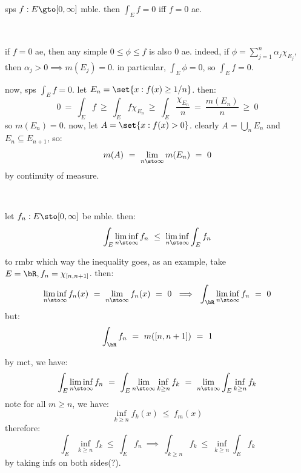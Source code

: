 \begin{lm}
	sps $f:E\gto[0,\infty]$ mble. then $\int_{E}f=0$ iff $f=0$ ae.
\end{lm} \

\begin{pf}
	if $f=0$ ae, then any simple $0\leq\phi\leq f$ is also 0 ae.
	indeed, if $\phi=\sum_{j=1}^{n}\alpha_{j}\chi_{E_{j}}$, then $\alpha_{j}>0 \implies m(E_{j})=0$.
	in particular, $\int_{E}\phi=0$, so $\int_{E}f=0$.

	now, sps $\int_{E}f=0$. let $E_{n}=\set{x:f(x)\geq1/n}$. then:
	\begin{equation*}
		0 \ = \ \int_{E}f \ \geq \ \int_{E}f\chi_{E_{n}}
		\ \geq \ \int_{E}\frac{\chi_{E_{n}}}{n}
		\ = \ \frac{m(E_{n})}{n} \ \geq \ 0
	\end{equation*}
	so $m(E_{n})=0$. now, let $A=\set{x:f(x)>0}$.
	clearly $A=\bigcup_{n}E_{n}$ and $E_{n}\subseteq E_{n+1}$, so:
	\begin{equation*}
		m(A) \ = \ \lim_{n\sto\infty}m(E_{n}) \ = \ 0
	\end{equation*}
	by continuity of measure.
\end{pf} \

\begin{thm}[title=Fatou's Lemma]
	let $f_{n}:E\sto[0,\infty]$ be mble. then:
	\begin{equation*}
		\int_{E}\liminf_{n\sto\infty}f_{n}
		\ \leq \ \liminf_{n\sto\infty}\int_{E}f_{n}
	\end{equation*}
\end{thm}

to rmbr which way the inequality goes, as an example,
take $E=\bR,f_{n}=\chi_{[n,n+1]}$. then:
\begin{equation*}
	\liminf_{n\sto\infty}f_{n}(x) \ = \ \lim_{n\sto\infty}f_{n}(x) \ = \ 0
	\ \implies \ \int_{\bR}\liminf_{n\sto\infty}f_{n} \ = \ 0
\end{equation*}
but:
\begin{equation*}
	\int_{\bR}f_{n} \ = \ m([n,n+1]) \ = \ 1
\end{equation*}


\begin{pf}
	by mct, we have:
	\begin{equation*}
		\int_{E}\liminf_{n\sto\infty}f_{n}
		\ = \ \int_{E}\lim_{n\sto\infty}\inf_{k\geq n}f_{k}
		\ = \ \lim_{n\sto\infty}\int_{E}\inf_{k\geq n}f_{k}
	\end{equation*}
	note for all $m\geq n$, we have:
	\begin{equation*}
		\inf_{k\geq n}f_{k}(x) \ \leq \ f_{m}(x)
	\end{equation*}
	therefore:
	\begin{equation*}
		\int_{E}\inf_{k\geq n}f_{k} \ \leq \ \int_{E}f_{n}
		\ \implies \ \int_{k\geq n}f_{k} \ \leq \ \inf_{k\geq n}\int_{E}f_{k}
	\end{equation*}
	by taking infs on both sides(?).
\end{pf} \

